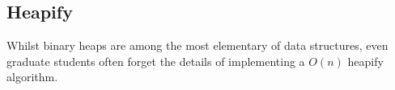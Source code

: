 \subsection*{Heapify}

Whilst binary heaps are among the most elementary of data structures, even graduate students often forget the details of implementing a $O(n)$ heapify algorithm.